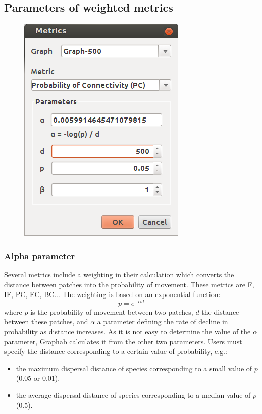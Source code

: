 \documentclass{article}
\begin{document}
\subsection{Parameters of weighted metrics}
\label{param_weight}

\begin{figure}[H]
	\includegraphics[scale=0.5]{img/manual-en_img10.png}
\end{figure}


\subsubsection{Alpha parameter}

Several metrics include a weighting in their calculation which converts the distance between patches into the probability of movement. These metrics are F, IF, PC, EC, BC... The weighting is based on an exponential function:
\begin{equation*}
p={e}^{-\mathit{\alpha d}}
\end{equation*}
where $p$ is the probability of movement between two patches, $d$ the distance between these patches, and $\alpha$ a parameter defining the rate of decline in probability as distance increases. As it is not easy to determine the value of the $\alpha$ parameter, Graphab calculates it from the other two parameters. Users must specify the distance corresponding to a certain value of probability, e.g.:
\begin{itemize}
	\item the maximum dispersal distance of species corresponding to a small value of $p$ (0.05 or 0.01).
	\item the average dispersal distance of species corresponding to a median value of $p$ (0.5).
\end{itemize}
\end{document}
